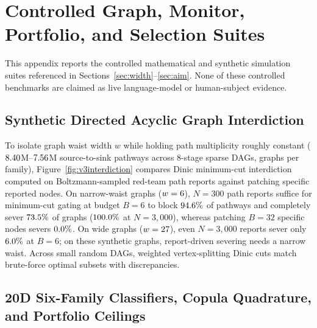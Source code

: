 \section{Controlled Graph, Monitor, Portfolio, and Selection Suites}\label{app:sim}

This appendix reports the controlled mathematical and synthetic simulation suites referenced in Sections~\ref{sec:width}--\ref{sec:aim}. None of these controlled benchmarks are claimed as live language-model or human-subject evidence.

\subsection{Synthetic Directed Acyclic Graph Interdiction}

To isolate graph waist width \(w\) while holding path multiplicity roughly constant (\(8.40\)M--\(7.56\)M source-to-sink pathways across 8-stage sparse DAGs, \VThreeInterGraphsPerFamily{} graphs per family), Figure~\ref{fig:v3interdiction} compares Dinic minimum-cut interdiction~\cite{dinic1970} computed on Boltzmann-sampled red-team path reports against patching specific reported nodes. On narrow-waist graphs (\(w = 6\)), \(N = 300\) path reports suffice for minimum-cut gating at budget \(B = 6\) to block \(94.6\%\) of pathways and completely sever \(73.5\%\) of graphs (\(100.0\%\) at \(N = 3{,}000\)), whereas patching \(B = 32\) specific nodes severs \(0.0\%\). On wide graphs (\(w = 27\)), even \(N = 3{,}000\) reports sever only \(6.0\%\) at \(B = 6\); on these synthetic graphs, report-driven severing needs a narrow waist. Across \VThreeCutsBruteForceChecked{} small random DAGs, weighted vertex-splitting Dinic cuts match brute-force optimal subsets with \VThreeCutsBruteForceDiscrepancies{} discrepancies.



\subsection{20D Six-Family Classifiers, Copula Quadrature, and Portfolio Ceilings}

